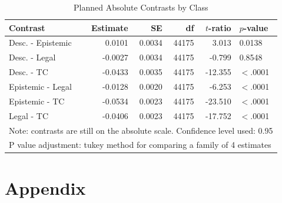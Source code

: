 \documentclass{article}
\begin{document}
\begin{table}[ht]
\centering
\begin{tabular}{lrrrrl}
  \hline
Contrast & Estimate & SE & df & $t$-ratio & $p$-value \\ 
  \hline
\rowcolor{gray!25}Desc. - Epistemic & 0.0101 & 0.0034 & 44175 & 3.013 & 0.0138 \\ 
  Desc. - Legal & -0.0027 & 0.0034 & 44175 & -0.799 & 0.8548 \\ 
\rowcolor{gray!25}  Desc. - TC & -0.0433 & 0.0035 & 44175 & -12.355 & $<$.0001 \\ 
  Epistemic - Legal & -0.0128 & 0.0020 & 44175 & -6.253 & $<$.0001 \\ 
\rowcolor{gray!25}  Epistemic - TC & -0.0534 & 0.0023 & 44175 & -23.510 & $<$.0001 \\ 
  Legal - TC & -0.0406 & 0.0023 & 44175 & -17.752 & $<$.0001 \\ 
   \hline
\multicolumn{6}{l}{{\footnotesize Note: contrasts are still on the absolute scale. Confidence level used: 0.95}}\\
\multicolumn{6}{l}{{\footnotesize P value adjustment: tukey method for comparing a family of 4 estimates}}\\
\end{tabular}
\caption{Planned Absolute Contrasts by Class}
\label{tab:s2m1}
\end{table}






\pagebreak
\section{Appendix}
\label{sec:appendix}
\end{document}
